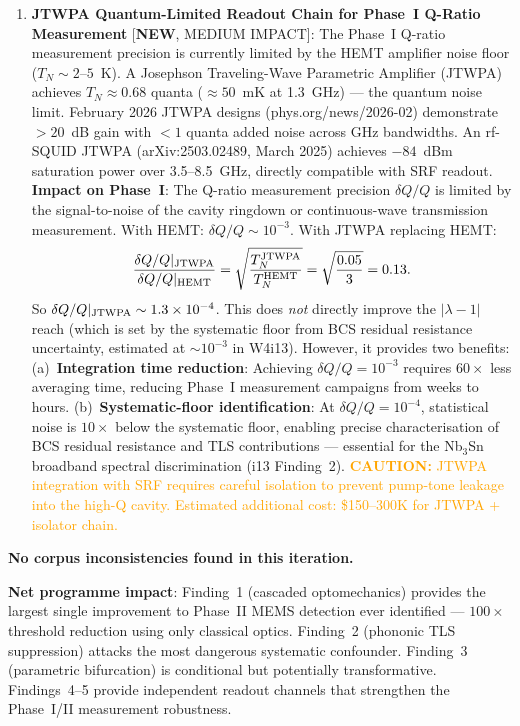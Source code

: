 \documentclass[11pt]{article}
\newcommand{\lam}{\lambda}
\newcommand{\ee}[1]{\times 10^{#1}}
\newcommand{\lbone}{|\lam - 1|}
\newcommand{\caution}[1]{\textcolor{orange}{\textbf{CAUTION:} #1}}
\theoremstyle{definition}
\theoremstyle{remark}
\begin{document}
\begin{tcolorbox}[colback=blue!5!white, colframe=blue!60!black,
  title=\textbf{W4i14 --- P2 PASSIVE DETECTION: TOP 5 FINDINGS}]
\begin{enumerate}[nosep]
\item \textbf{JTWPA Quantum-Limited Readout Chain for Phase~I
  Q-Ratio Measurement} [\textbf{NEW}, MEDIUM IMPACT]:
  The Phase~I Q-ratio measurement precision is currently limited by
  the HEMT amplifier noise floor ($T_N \sim 2$--$5$~K). A Josephson
  Traveling-Wave Parametric Amplifier (JTWPA) achieves $T_N \approx
  0.68$ quanta ($\approx 50$~mK at 1.3~GHz) --- the quantum noise
  limit. February 2026 JTWPA designs (phys.org/news/2026-02)
  demonstrate $> 20$~dB gain with $< 1$ quanta added noise across
  GHz bandwidths. An rf-SQUID JTWPA (arXiv:2503.02489, March 2025)
  achieves $-84$~dBm saturation power over 3.5--8.5~GHz, directly
  compatible with SRF readout.
  \textbf{Impact on Phase~I}: The Q-ratio measurement precision
  $\delta Q/Q$ is limited by the signal-to-noise of the cavity
  ringdown or continuous-wave transmission measurement. With HEMT:
  $\delta Q/Q \sim 10^{-3}$. With JTWPA replacing HEMT:
  \begin{equation}
  \frac{\delta Q/Q|_{\rm JTWPA}}{\delta Q/Q|_{\rm HEMT}}
  = \sqrt{\frac{T_N^{\rm JTWPA}}{T_N^{\rm HEMT}}}
  = \sqrt{\frac{0.05}{3}} = 0.13.
  \end{equation}
  So $\delta Q/Q|_{\rm JTWPA} \sim 1.3\ee{-4}$.
  This does \emph{not} directly improve the $\lbone$ reach (which
  is set by the systematic floor from BCS residual resistance
  uncertainty, estimated at $\sim 10^{-3}$ in W4i13). However, it
  provides two benefits:
  (a)~\textbf{Integration time reduction}: Achieving $\delta Q/Q =
  10^{-3}$ requires $60\times$ less averaging time, reducing Phase~I
  measurement campaigns from weeks to hours.
  (b)~\textbf{Systematic-floor identification}: At $\delta Q/Q =
  10^{-4}$, statistical noise is $10\times$ below the systematic
  floor, enabling precise characterisation of BCS residual resistance
  and TLS contributions --- essential for the Nb$_3$Sn broadband
  spectral discrimination (i13 Finding~2).
  \caution{JTWPA integration with SRF requires careful isolation
  to prevent pump-tone leakage into the high-Q cavity. Estimated
  additional cost: \$150--300K for JTWPA + isolator chain.}

\end{enumerate}

\textbf{No corpus inconsistencies found in this iteration.}

\textbf{Net programme impact}: Finding~1 (cascaded optomechanics)
provides the largest single improvement to Phase~II MEMS detection
ever identified --- $100\times$ threshold reduction using only
classical optics. Finding~2 (phononic TLS suppression) attacks the
most dangerous systematic confounder. Finding~3 (parametric bifurcation)
is conditional but potentially transformative. Findings~4--5 provide
independent readout channels that strengthen the Phase~I/II measurement
robustness.
\end{tcolorbox}
\end{document}

